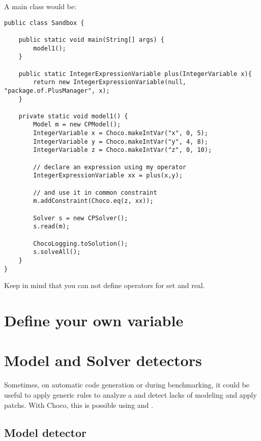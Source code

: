 A main class would be:
\begin{lstlisting}
public class Sandbox {

    public static void main(String[] args) {
        model1();
    }

    public static IntegerExpressionVariable plus(IntegerVariable x){
        return new IntegerExpressionVariable(null, "package.of.PlusManager", x);
    }

    private static void model1() {
        Model m = new CPModel();
        IntegerVariable x = Choco.makeIntVar("x", 0, 5);
        IntegerVariable y = Choco.makeIntVar("y", 4, 8);
        IntegerVariable z = Choco.makeIntVar("z", 0, 10);
	
        // declare an expression using my operator
        IntegerExpressionVariable xx = plus(x,y);

        // and use it in common constraint
        m.addConstraint(Choco.eq(z, xx));

        Solver s = new CPSolver();
        s.read(m);

        ChocoLogging.toSolution();
        s.solveAll();
    }
}
\end{lstlisting}

Keep in mind that you can not define operators for set and real. 


\section{Define your own variable}\label{advanced:defineyourownvariable}\hypertarget{advanced:defineyourownvariable}{}

\section{Model and Solver detectors}\label{advanced:detectors}\hypertarget{advanced:detectors}{}

Sometimes, on automatic code generation or during benchmarking, it could be useful to apply generic rules to analyze a  and detect lacks of modeling and apply patchs. With Choco, this is possible using  and .

\subsection{Model detector}\label{advanced:modeldetector}\hypertarget{advanced:modeldetector}{}


